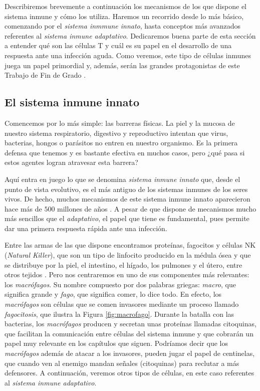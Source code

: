 Describiremos brevemente a continuación los mecanismos de los que dispone el sistema inmune y cómo los utiliza. Haremos un recorrido desde lo más básico, comenzando por el \textit{sistema inmmune innato}, hasta conceptos más avanzados referentes al \textit{sistema inmune adaptativo}. Dedicaremos buena parte de esta sección a entender qué son las células T y cuál es su papel en el desarrollo de una respuesta ante una infección aguda. Como veremos, este tipo de células inmunes juega un papel primordial y, además, serán las grandes protagonistas de este Trabajo de Fin de Grado \citep{JTB}.  

\subsection{El sistema inmune innato}
\label{sub:sistInmInnato}

Comencemos por lo más simple: las barreras físicas. La piel y la mucosa de nuestro sistema respiratorio, digestivo y reproductivo intentan que virus, bacterias, hongos o parásitos no entren en nuestro organismo. Es la primera defensa que tenemos y es bastante efectiva en muchos casos, pero ¿qué pasa si estos agentes logran atravesar esta barrera?

Aquí entra en juego lo que se denomina \textit{sistema inmune innato} que, desde el punto de vista evolutivo, es el más antiguo de los sistemas inmunes de los seres vivos. De hecho, muchos mecanismos de este sistema inmune innato aparecieron hace más de $500$ millones de años \citep{theHowItWorks}. A pesar de que dispone de mecanismos mucho más sencillos que el \textit{adaptativo}, el papel que tiene es fundamental, pues permite dar una primera respuesta rápida ante una infección. 

Entre las armas de las que dispone encontramos proteínas, fagocitos y células NK (\textit{Natural Killer}), que son un tipo de linfocito producido en la médula ósea y que se distribuye por la piel, el intestino, el hígado, los pulmones y el útero, entre otros tejidos \citep{celulasNK}. Pero nos centraremos en uno de sus componentes más relevantes: los \textit{macrófagos}. Su nombre compuesto por dos palabras griegas: \textit{macro}, que significa grande y \textit{fago}, que significa comer, lo dice todo. En efecto, los \textit{macrófagos} son células que se comen invasores mediante un proceso llamado \textit{fagocitosis}, que ilustra la Figura \ref{fig:macrofago}. Durante la batalla con las bacterias, los \textit{macrófagos} producen y secretan unas proteínas llamadas citoquinas, que facilitan la comunicación entre células del sistema inmune y que cobrarán un papel muy relevante en los capítulos que siguen. Podríamos decir que los \textit{macrófagos} además de atacar a los invasores, pueden jugar el papel de centinelas, que cuando ven al enemigo mandan señales (citoquinas) para reclutar a más defensores. A continuación, veremos otros tipos de células, en este caso referentes al \textit{sistema inmune adaptativo}.

